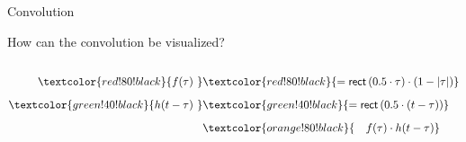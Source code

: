 \begin{frame}[t]{Convolution}

    How can the convolution be visualized?
    \vspace{0.2cm}

    \begin{center}
        \begin{columns}[t, onlytextwidth]
            \begin{column}{0.5\textwidth}
                \centering{}
                \only<1>{\scalebox{0.5}{}}%
                \begin{align*}
                    \textcolor{red!80!black}{f(\tau)~}     & \textcolor{red!80!black}{= \mathsf{rect}\left(0.5\cdot \tau\right) \cdot \left(1-\left| \tau \right|\right)} \\[0.2cm]
                    \textcolor{green!40!black}{h(t-\tau)~} & \textcolor{green!40!black}{= \mathsf{rect}\left(0.5\cdot \left(t-\tau\right)\right)}                         \\[0.2cm]
                                                           & \textcolor{orange!80!black}{~~~f(\tau) \cdot h(t-\tau)}                                                      \\[0.2cm]
                \end{align*}


\end{column}
\end{columns}
\end{center}
\end{frame}
